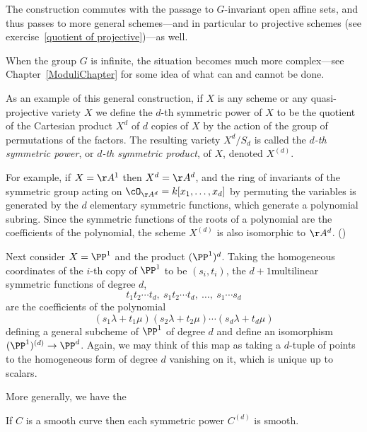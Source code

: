 The construction commutes with the passage to $G$-invariant open affine sets, and thus passes to more general schemes---and in particular to projective schemes (see exercise~\ref{quotient of projective})---as well.

When the group $G$ is infinite, the situation becomes much more complex---see Chapter~\ref{ModuliChapter} for some  idea of what can and cannot be done.

As an example of this general construction, if $X$ is any scheme or any quasi-projective variety $X$ we define the $d$-th symmetric power of $X$ to be the quotient of the Cartesian product $X^d$ of $d$ copies of $X$ by the action of the group of permutations of the factors. The resulting variety $X^d/S_d$ is called the \emph{$d$-th symmetric power}, or \emph{$d$-th symmetric product}, of $X$, denoted  $X^{(d)}$. 


For example, if $X=\AA^{1}$ then $X^{d} = \AA^{d}$, and the ring of invariants of the symmetric group acting on
$\cO_{\AA^{d}} = k[x_{1}, \dots, x_{d}]$ by permuting the variables is generated by the $d$ elementary symmetric functions, which generate a polynomial subring. Since the symmetric functions of the roots of a polynomial are the coefficients of
the polynomial, the scheme $X^{(d)}$ is also isomorphic to $\AA^{d}$. (\cite[Exercises 1.6, 13.2-13.4]{Eisenbud1995})

Next consider $X = \PP^1$ and the product $(\PP^1)^d$. Taking the homogeneous coordinates of the
$i$-th copy of $\PP^1$ to be $(s_i,t_i)$, the $d+1 $multilinear symmetric functions of degree $d$,
$$
t_1t_2\cdots t_d,\ s_1t_2\cdots t_d,\ \dots,\ s_1\cdots s_d
$$
are the coefficients of the polynomial
$$
(s_1\lambda + t_1\mu)(s_2\lambda + t_2\mu)\cdots(s_d\lambda + t_d\mu)
$$
defining a general subcheme of $\PP^1$ of degree $d$ and  define
an isomorphism $(\PP^1)^{(d)} \to \PP^d$.
Again, we may think of this map as taking a $d$-tuple of points to the
homogeneous form of degree $d$ vanishing on it, which is unique up to scalars.

More generally, we have the

\begin{proposition}
If $C$ is a smooth curve then each symmetric power $C^{(d)}$ is smooth.
\end{proposition}

